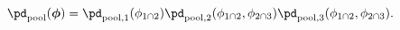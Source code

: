 \begin{equation}
  \pd_{\text{pool}}(\boldsymbol{\phi}) = 
    \pd_{\text{pool}, 1}(\phi_{1 \cap 2})
    \pd_{\text{pool}, 2}(\phi_{1 \cap 2}, \phi_{2 \cap 3})
    \pd_{\text{pool}, 3}(\phi_{1 \cap 2}, \phi_{2 \cap 3}).
  \label{eqn:sequential-sampler-decomposition}
\end{equation}